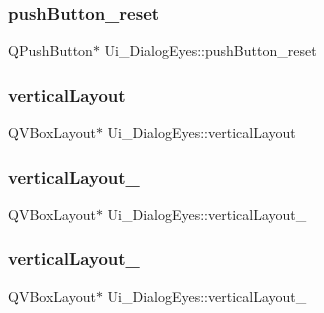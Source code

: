 \hypertarget{class_ui___dialog_eyes_abf6a5d6aa5f67da211f2ff9a573ad4ac}{}\label{class_ui___dialog_eyes_abf6a5d6aa5f67da211f2ff9a573ad4ac} 
\subsubsection{\texorpdfstring{push\+Button\+\_\+reset}{pushButton\_reset}}
{\footnotesize\ttfamily Q\+Push\+Button$\ast$ Ui\+\_\+\+Dialog\+Eyes\+::push\+Button\+\_\+reset}

\hypertarget{class_ui___dialog_eyes_a7268513884026bc8a04b16b04fc41cde}{}\label{class_ui___dialog_eyes_a7268513884026bc8a04b16b04fc41cde} 
\subsubsection{\texorpdfstring{vertical\+Layout}{verticalLayout}}
{\footnotesize\ttfamily Q\+V\+Box\+Layout$\ast$ Ui\+\_\+\+Dialog\+Eyes\+::vertical\+Layout}

\hypertarget{class_ui___dialog_eyes_a72332239b48624787211c642925f9c57}{}\label{class_ui___dialog_eyes_a72332239b48624787211c642925f9c57} 
\subsubsection{\texorpdfstring{vertical\+Layout\+\_}{verticalLayout\_2}}
{\footnotesize\ttfamily Q\+V\+Box\+Layout$\ast$ Ui\+\_\+\+Dialog\+Eyes\+::vertical\+Layout\+\_}

\hypertarget{class_ui___dialog_eyes_a894170ae9e75a9d3800072b4ebfa2639}{}\label{class_ui___dialog_eyes_a894170ae9e75a9d3800072b4ebfa2639} 
\subsubsection{\texorpdfstring{vertical\+Layout\+\_}{verticalLayout\_7}}
{\footnotesize\ttfamily Q\+V\+Box\+Layout$\ast$ Ui\+\_\+\+Dialog\+Eyes\+::vertical\+Layout\+\_}

